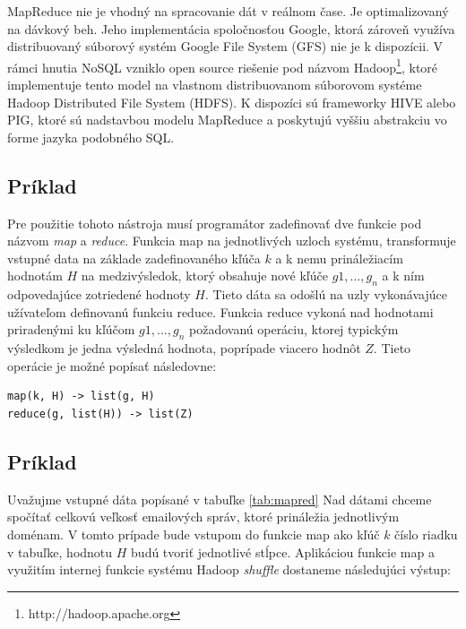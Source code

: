 \documentclass[11pt,twoside,a4paper]{book}
\begin{document}
MapReduce nie je vhodný na spracovanie dát v reálnom čase. Je optimalizovaný na dávkový beh. Jeho implementácia spoločnosťou Google, ktorá zároveň využíva distribuovaný súborový systém Google File System (GFS) \cite{ghemawat2003google} nie je k dispozícii. V rámci hnutia NoSQL vzniklo open source riešenie pod názvom Hadoop\footnote{http://hadoop.apache.org}, ktoré implementuje tento model na vlastnom distribuovanom súborovom systéme Hadoop Distributed File System (HDFS). K dispozíci sú frameworky HIVE alebo PIG, ktoré sú nadstavbou modelu MapReduce a poskytujú vyššiu abstrakciu vo forme jazyka podobného SQL.


\subsection{Príklad}

Pre použitie tohoto nástroja musí programátor zadefinovať dve funkcie pod názvom \emph{map} a \emph{reduce}. Funkcia map na jednotlivých uzloch systému, transformuje vstupné data na základe zadefinovaného kľúča $k$ a k nemu prináležiacím hodnotám $H$ na medzivýsledok, ktorý obsahuje nové kľúče $g1,...,g_n$ a k ním odpovedajúce zotriedené hodnoty $H$. Tieto dáta sa odošlú na uzly vykonávajúce užívateľom definovanú funkciu reduce. Funkcia reduce vykoná nad hodnotami priradenými ku kľúčom $g1,...,g_n$ požadovanú operáciu, ktorej typickým výsledkom je jedna výsledná hodnota, poprípade viacero hodnôt $Z$. Tieto operácie je možné popísať následovne:

\begin{verbatim}
map(k, H) -> list(g, H)
reduce(g, list(H)) -> list(Z)
\end{verbatim}

\subsection{Príklad}

Uvažujme vstupné dáta popísané v tabuľke \ref{tab:mapred} Nad dátami chceme spočítať celkovú veľkosť emailových správ, ktoré prináležia jednotlivým doménam. V tomto prípade bude vstupom do funkcie map ako kľúč $k$ číslo riadku v tabuľke, hodnotu $H$ budú tvoriť jednotlivé stĺpce. Aplikáciou funkcie map a využitím internej funkcie systému Hadoop \emph{shuffle} dostaneme následujúci výstup:
\end{document}
